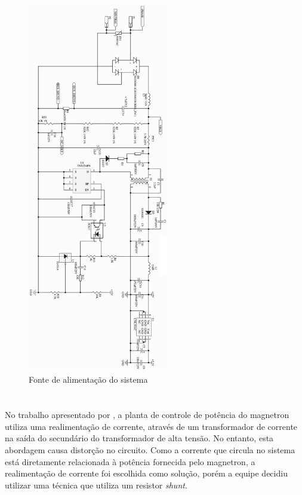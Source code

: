 \begin{figure}[H]
   \centering
    \includegraphics[width=0.55\textwidth]{./dados/figuras/proj-font-alim}
    \caption{Fonte de alimentação do sistema}
    \label{fig:proj-font-alim}
\end{figure}

\pagebreak


\section{}
\label{sec:shunt}
No trabalho apresentado por , a planta de controle de potência do magnetron utiliza uma realimentação de corrente, através de um transformador de corrente na saída do secundário do transformador de alta tensão. No entanto, esta abordagem causa distorção no circuito. Como a corrente que circula no sistema está diretamente relacionada à potência fornecida pelo magnetron, a realimentação de corrente foi escolhida como solução, porém a equipe decidiu utilizar uma técnica que utiliza um resistor \textit{shunt}.

